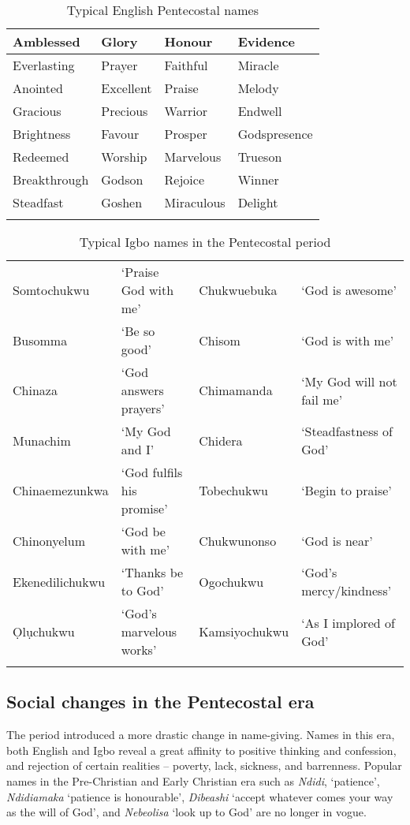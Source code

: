 \documentclass[output=paper]{langscibook}
\begin{document}
\begin{table}
\caption{\label{tab:owaleke:4.4}Typical English Pentecostal names}
\begin{tabular}{llll}
\lsptoprule
Amblessed     &    Glory          & Honour    &       Evidence  \\
\midrule
Everlasting   &   Prayer     &      Faithful    &        Miracle  \\        Anointed   &     Excellent     &     Praise      &      Melody  \\           Gracious    &   Precious     &      Warrior       &   Endwell   \\
Brightness & Favour & Prosper &           Godspresence      \\
Redeemed     & Worship    &     Marvelous      &   Trueson   \\
Breakthrough  & Godson    &     Rejoice     &   Winner \\
Steadfast    &   Goshen &     Miraculous  &          Delight \\
\lspbottomrule
\end{tabular}
\end{table}


\begin{table}
\caption{\label{tab:owaleke:4.5}Typical Igbo names in the Pentecostal period}
\begin{tabularx}{\textwidth}{lQlQ}
\lsptoprule
Somtochukwu  &‘Praise God with me’ &  Chukwuebuka  &   ‘God is awesome’ \\   
Busomma  & ‘Be so good’    &Chisom    &     ‘God is with me’\\
Chinaza & ‘God answers prayers’  & Chimamanda &‘My God will not fail me’ \\  Munachim   &‘My God and I’    &Chidera &    ‘Steadfastness of God’  \\       Chinaemezunkwa&‘God fulfils his promise’& Tobechukwu & ‘Begin to praise’ \\  Chinonyelum &‘God be with me' &Chukwunonso   &  ‘God is near’  \\         Ekenedilichukwu & ‘Thanks be to God’ & Ogochukwu & ‘God’s mercy/kindness’\\  
Ọlụchukwu      &     ‘God’s marvelous works’ & Kamsiyochukwu &  ‘As I implored of God’\\
\lspbottomrule
\end{tabularx}
\end{table}



\subsection{Social changes in the Pentecostal era}
The period introduced a more drastic change in name-giving. Names in this era, both English and Igbo reveal a great affinity to positive thinking and confession, and rejection of certain realities -- poverty, lack, sickness, and barrenness. Popular names in the Pre-Christian and Early Christian era such as \textit{Ndidi}, ‘patience’, \textit{Ndidiamaka} ‘patience is honourable’, \textit{Dibeashi} ‘accept whatever comes your way as the will of God’, and \textit{Nebeolisa} ‘look up to God’ are no longer in vogue. 
\end{document}
